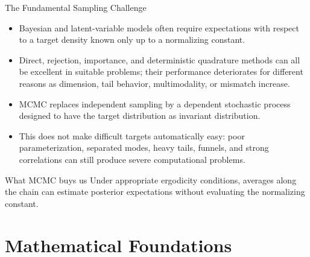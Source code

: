 \documentclass[aspectratio=169,11pt]{beamer}
\begin{document}
\begin{frame}{The Fundamental Sampling Challenge}
  \begin{itemize}
    \item Bayesian and latent-variable models often require expectations with respect to a target density known only up to a normalizing constant.
    \item Direct, rejection, importance, and deterministic quadrature methods can all be excellent in suitable problems; their performance deteriorates for different reasons as dimension, tail behavior, multimodality, or mismatch increase.
    \item MCMC replaces independent sampling by a dependent stochastic process designed to have the target distribution as invariant distribution.
    \item This does not make difficult targets automatically easy: poor parameterization, separated modes, heavy tails, funnels, and strong correlations can still produce severe computational problems.
  \end{itemize}

  \begin{block}{What MCMC buys us}
    Under appropriate ergodicity conditions, averages along the chain can estimate posterior expectations without evaluating the normalizing constant.
  \end{block}
\end{frame}

\section{Mathematical Foundations}
\end{document}
